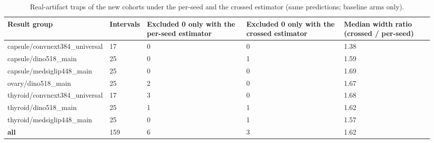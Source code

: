 \begin{table}[H]\centering\scriptsize
\caption{Real-artifact traps of the new cohorts under the per-seed and the crossed estimator (same predictions; baseline arms only).}\label{tab:estcheck}
\begin{tabular}{p{5.0cm}p{1.4cm}p{2.6cm}p{2.6cm}p{2.4cm}}\toprule
Result group & Intervals & Excluded 0 only with the per-seed estimator & Excluded 0 only with the crossed estimator & Median width ratio (crossed / per-seed) \\\midrule
capsule/\allowbreak{}convnext384\_universal & 17 & 0 & 0 & 1.38 \\
capsule/\allowbreak{}dino518\_main & 25 & 0 & 1 & 1.59 \\
capsule/\allowbreak{}medsiglip448\_main & 25 & 0 & 0 & 1.69 \\
ovary/\allowbreak{}dino518\_main & 25 & 2 & 0 & 1.67 \\
thyroid/\allowbreak{}convnext384\_universal & 17 & 3 & 0 & 1.68 \\
thyroid/\allowbreak{}dino518\_main & 25 & 1 & 1 & 1.62 \\
thyroid/\allowbreak{}medsiglip448\_main & 25 & 0 & 1 & 1.57 \\
\textbf{all} & 159 & 6 & 3 & 1.62 \\
\bottomrule\end{tabular}
\end{table}
